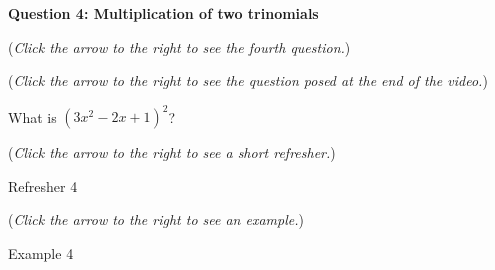 \documentclass{ximera}
\begin{document}
\textbf{Question 4: Multiplication of two trinomials}
\begin{question}
\begin{flushright}
{\color{blue}(\emph{Click the arrow to the right to see the fourth question.})}
\end{flushright}
\begin{center}
\begin{expandable}
\begin{flushright}
{\color{blue}(\emph{Click the arrow to the right to see the question
posed at the end of the video.})}
\end{flushright}
\begin{expandable}
What is $(3x^2 - 2x + 1)^2$?
\begin{multipleChoice}
\end{multipleChoice}
\begin{flushright}
{\color{blue}(\emph{Click the arrow to the right to see a short refresher.})}
\end{flushright}
\begin{expandable}
\begin{center}
Refresher 4
\end{center}
\end{expandable}
\begin{flushright}
{\color{blue}(\emph{Click the arrow to the right to see an example.})}
\end{flushright}
\begin{expandable}
\begin{center}
Example 4
\end{center}
\end{expandable}
\end{expandable}
\end{expandable}
\end{center}
\end{question}
\end{document}
